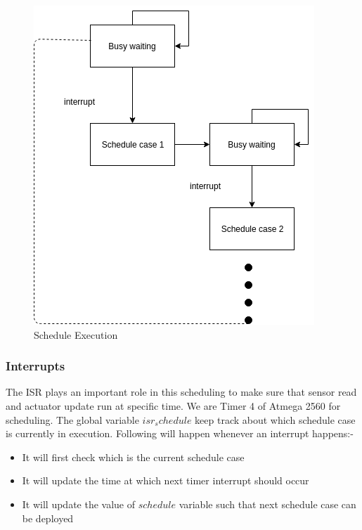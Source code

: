 \documentclass[16pt]{report}
\begin{document}
\begin{figure}[H]
\centering
\includegraphics[width=0.7\linewidth]{14execution.png}
\caption{Schedule Execution}
\end{figure}

\subsubsection{Interrupts}
The ISR plays an important role in this scheduling to make sure that sensor read and actuator update run at specific time. We are Timer 4 of Atmega 2560 for scheduling. The global variable $isr_schedule$  keep track about which schedule case is currently in execution. Following will happen whenever an interrupt happens:-
\begin{itemize}
    \item It will first check which is the current schedule case
    \item It will update the time at which next timer interrupt should occur
    \item It will update the value of $schedule$ variable such that next schedule case can be deployed
    
\end{itemize}
\end{document}
